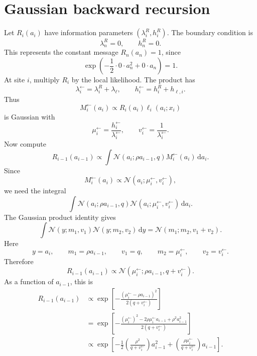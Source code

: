 \documentclass[11pt]{article}
\newcommand{\N}{\mathcal{N}}
\newcommand{\dd}{\,\mathrm{d}}
\begin{document}
\section{Gaussian backward recursion}

Let \(R_i(a_i)\) have information parameters \((\lambda_i^R,h_i^R)\). The boundary condition is
\begin{equation}
  \lambda_n^R=0,
  \qquad
  h_n^R=0.
\end{equation}
This represents the constant message \(R_n(a_n)=1\), since
\[
  \exp\left(-\frac12\cdot0\cdot a_n^2+0\cdot a_n\right)=1.
\]
At site \(i\), multiply \(R_i\) by the local likelihood. The product has
\begin{equation}
  \lambda_i^{\leftarrow}=\lambda_i^R+\lambda_\ell,
  \qquad
  h_i^{\leftarrow}=h_i^R+h_{\ell,i}.
\end{equation}
Thus
\begin{equation}
  M_i^{\leftarrow}(a_i)
  \propto
  R_i(a_i)\ell_i(a_i;x_i)
\end{equation}
is Gaussian with
\begin{equation}
  \mu_i^{\leftarrow}=\frac{h_i^{\leftarrow}}{\lambda_i^{\leftarrow}},
  \qquad
  v_i^{\leftarrow}=\frac{1}{\lambda_i^{\leftarrow}}.
\end{equation}
Now compute
\begin{equation}
  R_{i-1}(a_{i-1})
  \propto
  \int \N(a_i;\rho a_{i-1},q)
  M_i^{\leftarrow}(a_i)
  \dd a_i.
\end{equation}
Since
\[
  M_i^{\leftarrow}(a_i)\propto \N(a_i;\mu_i^{\leftarrow},v_i^{\leftarrow}),
\]
we need the integral
\begin{equation}
  \int
  \N(a_i;\rho a_{i-1},q)
  \N(a_i;\mu_i^{\leftarrow},v_i^{\leftarrow})
  \dd a_i.
\end{equation}
The Gaussian product identity gives
\begin{equation}
  \int \N(y;m_1,v_1)\N(y;m_2,v_2)\dd y
  =\N(m_1;m_2,v_1+v_2).
\end{equation}
Here
\[
  y=a_i,
  \qquad
  m_1=\rho a_{i-1},
  \qquad
  v_1=q,
  \qquad
  m_2=\mu_i^{\leftarrow},
  \qquad
  v_2=v_i^{\leftarrow}.
\]
Therefore
\begin{equation}
  R_{i-1}(a_{i-1})
  \propto
  \N(\mu_i^{\leftarrow};\rho a_{i-1},q+v_i^{\leftarrow}).
\end{equation}
As a function of \(a_{i-1}\), this is
\begin{align}
  R_{i-1}(a_{i-1})
  &\propto
  \exp\left[-\frac{(\mu_i^{\leftarrow}-\rho a_{i-1})^2}{2(q+v_i^{\leftarrow})}\right] \\
  &=
  \exp\left[-\frac{(\mu_i^{\leftarrow})^2-2\rho\mu_i^{\leftarrow}a_{i-1}+\rho^2a_{i-1}^2}{2(q+v_i^{\leftarrow})}\right] \\
  &\propto
  \exp\left[-\frac12\left(\frac{\rho^2}{q+v_i^{\leftarrow}}\right)a_{i-1}^2
  +\left(\frac{\rho\mu_i^{\leftarrow}}{q+v_i^{\leftarrow}}\right)a_{i-1}\right].
\end{align}
\end{document}
